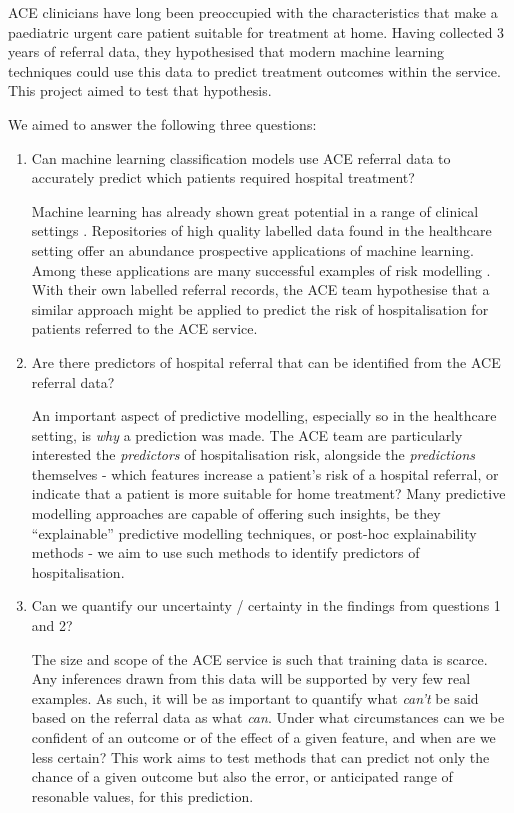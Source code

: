 ACE clinicians have long been preoccupied with the characteristics that make a paediatric urgent care patient suitable for treatment at home.
Having collected 3 years of referral data, they hypothesised that modern machine learning techniques could use this data to predict treatment outcomes within the service.
This project aimed to test that hypothesis.

We aimed to answer the following three questions:

\begin{enumerate}
    \item Can machine learning classification models use ACE referral data to accurately predict which patients required hospital treatment?

    Machine learning has already shown great potential in a range of clinical settings \cite{topol_2019}. Repositories of high quality labelled data found in the healthcare setting offer an abundance prospective applications of machine learning. Among these applications are many successful examples of risk modelling \cite{golas_2018} \cite{rahimian_2018} \cite{desautels_2016}. With their own labelled referral records, the ACE team hypothesise that a similar approach might be applied to predict the risk of hospitalisation for patients referred to the ACE service.

    \item Are there predictors of hospital referral that can be identified from the ACE referral data?

    An important aspect of predictive modelling, especially so in the healthcare setting, is \textit{why} a prediction was made. The ACE team are particularly interested the \textit{predictors} of hospitalisation risk, alongside the \textit{predictions} themselves -  which features increase a patient's risk of a hospital referral, or indicate that a patient is more suitable for home treatment? Many predictive modelling approaches are capable of offering such insights, be they ``explainable'' predictive modelling techniques, or post-hoc explainability methods - we aim to use such methods to identify predictors of hospitalisation.

    \item Can we quantify our uncertainty / certainty in the findings from questions 1 and 2?

    The size and scope of the ACE service is such that training data is scarce. Any inferences drawn from this data will be supported by very few real examples. As such, it will be as important to quantify what \textit{can't} be said based on the referral data as what \textit{can}. Under what circumstances can we be confident of an outcome or of the effect of a given feature, and when are we less certain? This work aims to test methods that can predict not only the chance of a given outcome but also the error, or anticipated range of resonable values, for this prediction.

\end{enumerate}
